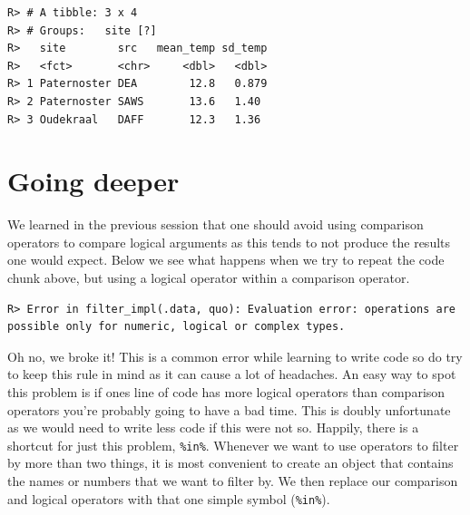 \documentclass[]{book}
\newenvironment{Shaded}{\begin{snugshade}}{\end{snugshade}}
\newcommand{\KeywordTok}[1]{\textcolor[rgb]{0.13,0.29,0.53}{\textbf{#1}}}
\newcommand{\DataTypeTok}[1]{\textcolor[rgb]{0.13,0.29,0.53}{#1}}
\newcommand{\StringTok}[1]{\textcolor[rgb]{0.31,0.60,0.02}{#1}}
\newcommand{\CommentTok}[1]{\textcolor[rgb]{0.56,0.35,0.01}{\textit{#1}}}
\newcommand{\OtherTok}[1]{\textcolor[rgb]{0.56,0.35,0.01}{#1}}
\newcommand{\OperatorTok}[1]{\textcolor[rgb]{0.81,0.36,0.00}{\textbf{#1}}}
\newcommand{\NormalTok}[1]{#1}
\theoremstyle{definition}
\theoremstyle{definition}
\theoremstyle{definition}
\theoremstyle{remark}
\begin{document}
\begin{verbatim}
R> # A tibble: 3 x 4
R> # Groups:   site [?]
R>   site        src   mean_temp sd_temp
R>   <fct>       <chr>     <dbl>   <dbl>
R> 1 Paternoster DEA        12.8   0.879
R> 2 Paternoster SAWS       13.6   1.40 
R> 3 Oudekraal   DAFF       12.3   1.36
\end{verbatim}

\section{Going deeper}\label{going-deeper}

We learned in the previous session that one should avoid using
comparison operators to compare logical arguments as this tends to not
produce the results one would expect. Below we see what happens when we
try to repeat the code chunk above, but using a logical operator within
a comparison operator.

\begin{Shaded}
\end{Shaded}

\begin{verbatim}
R> Error in filter_impl(.data, quo): Evaluation error: operations are possible only for numeric, logical or complex types.
\end{verbatim}

Oh no, we broke it! This is a common error while learning to write code
so do try to keep this rule in mind as it can cause a lot of headaches.
An easy way to spot this problem is if ones line of code has more
logical operators than comparison operators you're probably going to
have a bad time. This is doubly unfortunate as we would need to write
less code if this were not so. Happily, there is a shortcut for just
this problem, \texttt{\%in\%}. Whenever we want to use operators to
filter by more than two things, it is most convenient to create an
object that contains the names or numbers that we want to filter by. We
then replace our comparison and logical operators with that one simple
symbol (\texttt{\%in\%}).
\end{document}
